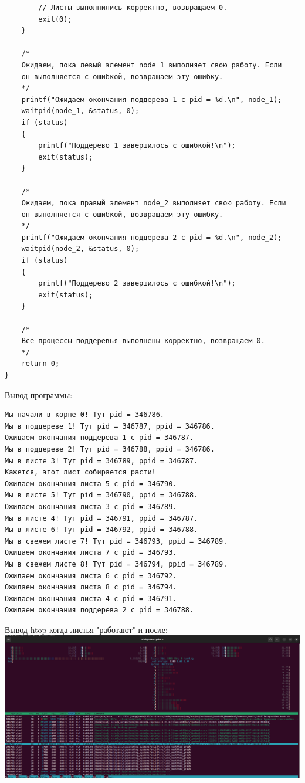 \documentclass[a4paper,14pt]{extarticle}
\begin{document}
\begin{verbatim}
        // Листы выполнились корректно, возвращаем 0.
        exit(0);
    }

    /*
    Ожидаем, пока левый элемент node_1 выполняет свою работу. Если
    он выполняется с ошибкой, возвращаем эту ошибку.
    */
    printf("Ожидаем окончания поддерева 1 с pid = %d.\n", node_1);
    waitpid(node_1, &status, 0);
    if (status)
    {
        printf("Поддерево 1 завершилось с ошибкой!\n");
        exit(status);
    }

    /*
    Ожидаем, пока правый элемент node_2 выполняет свою работу. Если
    он выполняется с ошибкой, возвращаем эту ошибку.
    */
    printf("Ожидаем окончания поддерева 2 с pid = %d.\n", node_2);
    waitpid(node_2, &status, 0);
    if (status)
    {
        printf("Поддерево 2 завершилось с ошибкой!\n");
        exit(status);
    }

    /*
    Все процессы-поддеревья выполнены корректно, возвращаем 0.
    */
    return 0;
}
\end{verbatim}
Вывод программы:\\
\begin{verbatim}
Мы начали в корне 0! Тут pid = 346786.
Мы в поддереве 1! Тут pid = 346787, ppid = 346786.
Ожидаем окончания поддерева 1 с pid = 346787.
Мы в поддереве 2! Тут pid = 346788, ppid = 346786.
Мы в листе 3! Тут pid = 346789, ppid = 346787.
Кажется, этот лист собирается расти!
Ожидаем окончания листа 5 с pid = 346790.
Мы в листе 5! Тут pid = 346790, ppid = 346788.
Ожидаем окончания листа 3 с pid = 346789.
Мы в листе 4! Тут pid = 346791, ppid = 346787.
Мы в листе 6! Тут pid = 346792, ppid = 346788.
Мы в свежем листе 7! Тут pid = 346793, ppid = 346789.
Ожидаем окончания листа 7 с pid = 346793.
Мы в свежем листе 8! Тут pid = 346794, ppid = 346789.
Ожидаем окончания листа 6 с pid = 346792.
Ожидаем окончания листа 8 с pid = 346794.
Ожидаем окончания листа 4 с pid = 346791.
Ожидаем окончания поддерева 2 с pid = 346788.
\end{verbatim}
Вывод htop когда листья "работают" и после:\\
\includegraphics[width=140mm]{modified_htop_before}\\
\end{document}
